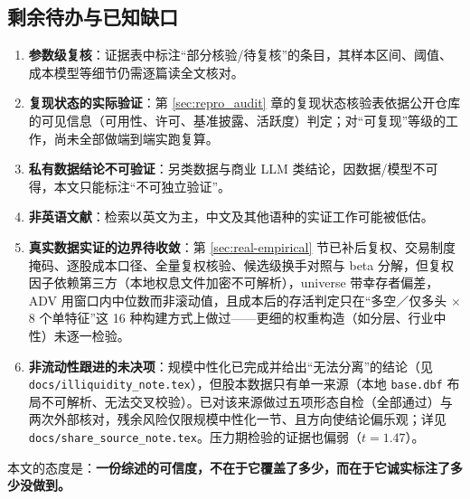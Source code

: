 \subsection{剩余待办与已知缺口}

\begin{enumerate}
  \item \textbf{参数级复核}：证据表中标注“部分核验/待复核”的条目，其样本区间、阈值、成本模型等细节仍需逐篇读全文核对。
  \item \textbf{复现状态的实际验证}：第 \ref{sec:repro_audit} 章的复现状态核验表依据公开仓库的可见信息（可用性、许可、基准披露、活跃度）判定；对“可复现”等级的工作，尚未全部做端到端实跑复算。
  \item \textbf{私有数据结论不可验证}：另类数据与商业 LLM 类结论，因数据/模型不可得，本文只能标注“不可独立验证”。
  \item \textbf{非英语文献}：检索以英文为主，中文及其他语种的实证工作可能被低估。
  \item \textbf{真实数据实证的边界待收敛}：第 \ref{sec:real-empirical} 节已补后复权、交易制度掩码、逐股成本口径、全量复权核验、候选级换手对照与 beta 分解，但复权因子依赖第三方（本地权息文件加密不可解析），universe 带幸存者偏差，ADV 用窗口内中位数而非滚动值，且成本后的存活判定只在“多空／仅多头 × 8 个单特征”这 16 种构建方式上做过——更细的权重构造（如分层、行业中性）未逐一检验。
  \item \textbf{非流动性跟进的未决项}：规模中性化已完成并给出“无法分离”的结论（见 \texttt{docs/illiquidity\_note.tex}），但股本数据只有单一来源（本地 \texttt{base.dbf} 布局不可解析、无法交叉校验）。已对该来源做过五项形态自检（全部通过）与两次外部核对，残余风险仅限规模中性化一节、且方向使结论偏乐观；详见 \texttt{docs/share\_source\_note.tex}。压力期检验的证据也偏弱（$t=1.47$）。
\end{enumerate}

\noindent 本文的态度是：\textbf{一份综述的可信度，不在于它覆盖了多少，而在于它诚实标注了多少没做到。}
